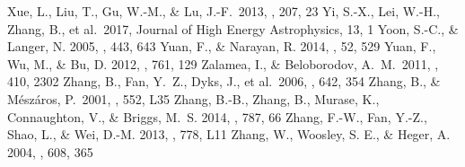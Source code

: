 \documentclass[twocolumn]{aastex6}
\begin{document}
\begin{thebibliography}{}
 Xue, L., Liu, T., Gu, W.-M., \& Lu, J.-F.\ 2013, \apjs, 207, 23
 Yi, S.-X., Lei, W.-H., Zhang, B., et al.\ 2017, Journal of High Energy Astrophysics, 13, 1
 Yoon, S.-C., \& Langer, N. 2005, \aap, 443, 643
 Yuan, F., \& Narayan, R. 2014, \araa, 52, 529
 Yuan, F., Wu, M., \& Bu, D. 2012, \apj, 761, 129
 Zalamea, I., \& Beloborodov, A.~M.\ 2011, \mnras, 410, 2302
 Zhang, B., Fan, Y.~Z., Dyks, J., et al.\ 2006, \apj, 642, 354
 Zhang, B., \& M{\'e}sz{\'a}ros, P.\ 2001, \apjl, 552, L35
 Zhang, B.-B., Zhang, B., Murase, K., Connaughton, V., \& Briggs, M.~S. 2014, \apj, 787, 66
 Zhang, F.-W., Fan, Y.-Z., Shao, L., \& Wei, D.-M. 2013, \apjl, 778, L11
 Zhang, W., Woosley, S. E., \& Heger, A. 2004, \apj, 608, 365
\end{thebibliography}

\clearpage
\end{document}
